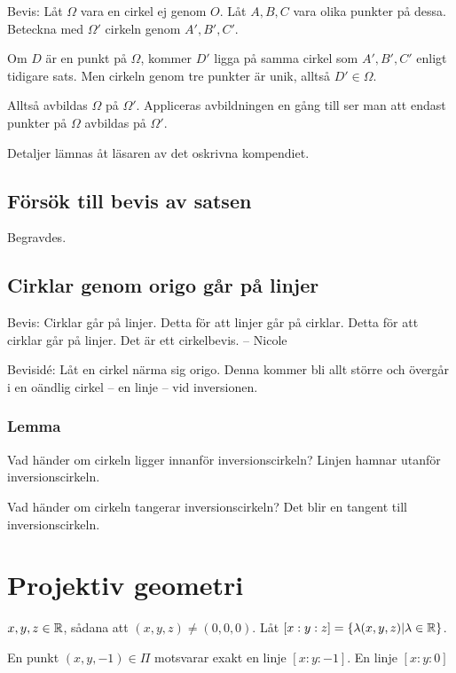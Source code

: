 \documentclass[10pt,a4paper]{article}
\begin{document}
Bevis: Låt $\Omega$ vara en cirkel ej genom $O$. 
Låt $A,B,C$ vara olika punkter på dessa.
Beteckna med $\Omega'$ cirkeln genom $A',B',C'$.

Om $D$ är en punkt på $\Omega$, kommer $D'$ ligga på samma cirkel som $A',B',C'$ enligt tidigare sats. Men cirkeln genom tre punkter är unik, alltså $D' \in \Omega$.

Alltså avbildas $\Omega$ på $\Omega'$. Appliceras avbildningen en gång till ser man att endast punkter på $\Omega$ avbildas på $\Omega'$. 

Detaljer lämnas åt läsaren av det oskrivna kompendiet.

\subsection{Försök till bevis av satsen}
Begravdes.

\subsection{Cirklar genom origo går på linjer}
Bevis: Cirklar går på linjer. Detta för att linjer går på cirklar. Detta för att cirklar går på linjer. Det är ett cirkelbevis. -- Nicole

Bevisidé:
Låt en cirkel närma sig origo. Denna kommer bli allt större och övergår i en oändlig cirkel -- en linje -- vid inversionen.

\subsubsection{Lemma}
Vad händer om cirkeln ligger innanför inversionscirkeln? Linjen hamnar utanför inversionscirkeln.

Vad händer om cirkeln tangerar inversionscirkeln? Det blir en tangent till inversionscirkeln.




\section{Projektiv geometri}
$x,y,z \in \mathbb{R}$, sådana att $(x,y,z) \neq (0,0,0)$.
Låt $[ x : y : z ] = \{ \lambda (x,y,z) | \lambda \in \mathbb{R} \}$.


En punkt $(x,y,-1) \in \Pi$ motsvarar exakt en linje $[ x : y : -1]$. En linje $[x:y:0]$
\end{document}
